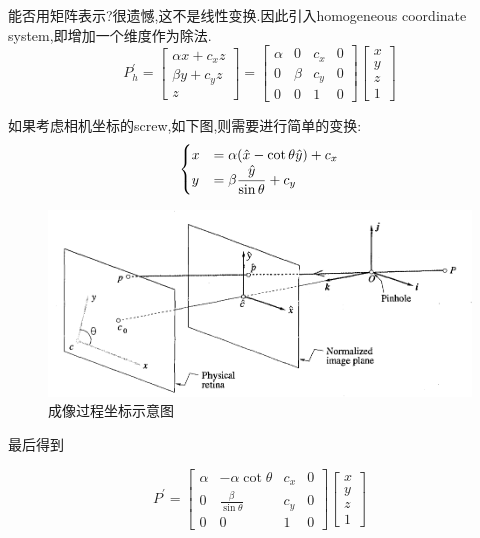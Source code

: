 能否用矩阵表示?很遗憾,这不是线性变换.因此引入homogeneous coordinate system,即增加一个维度作为除法.
\begin{equation}
	P_{h}^{\prime}=\left[\begin{array}{c}
		\alpha x+c_{x} z \\
		\beta y+c_{y} z \\
		z
	\end{array}\right]=\left[\begin{array}{cccc}
		\alpha & 0 & c_{x} & 0 \\
		0 & \beta & c_{y} & 0 \\
		0 & 0 & 1 & 0
	\end{array}\right]\left[\begin{array}{l}
		x \\
		y \\
		z \\
		1
	\end{array}\right]
\end{equation}

如果考虑相机坐标的screw,如下图,则需要进行简单的变换:
\begin{equation}
	\begin{cases}
		x &= \alpha(\hat x - \cot \theta \hat y) + c_x
		\\
		y &= \beta \displaystyle\frac{\hat{y}}{\sin \theta} + c_y
	\end{cases}
\end{equation}

\begin{figure}[htbp]
	\centering
	\includegraphics[scale=0.65]{figures/image_plane.png}
	\caption{成像过程坐标示意图}
	\label{}
\end{figure}

最后得到

\begin{equation}
	P^{\prime}=\left[\begin{array}{cccc}
		\alpha & -\alpha \cot \theta & c_{x} & 0 \\
		0 & \frac{\beta}{\sin \theta} & c_{y} & 0 \\
		0 & 0 & 1 & 0
	\end{array}\right]\left[\begin{array}{l}
		x \\
		y \\
		z \\
		1
	\end{array}\right]
\end{equation}

